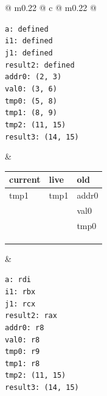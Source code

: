 \begin{figure}[H]
    \centering
    \small
    \begin{tabularx}{\textwidth}{@{} m{} @{\extracolsep{\fill}} c @{\extracolsep{\fill}} m{} @{}}
        \begin{tcolorbox}[standard jigsaw, opacityback=0, colframe=black, arc=4mm, width=\linewidth, height=6.2cm, valign=center, left=2pt, right=2pt]
            \texttt{\small a: defined \\ i1: defined \\ j1: defined \\ result2: defined \\ addr0: (2, 3) \\ val0: (3, 6) \\ tmp0: (5, 8) \\ tmp1: (8, 9) \\ tmp2: (11, 15) \\ result3: (14, 15)}
        \end{tcolorbox} 
        & 
        \renewcommand{\arraystretch}{1.3}
        \begin{tabular}{|p{2cm}|p{2cm}|p{2cm}|}
            \hline
            \textbf{current} & \textbf{live} & \textbf{old} \\ \hline
             tmp1   & tmp1  & addr0 \\ \hline
                    &       & val0  \\ \hline
                    &       & tmp0  \\ \hline
                    &       &       \\ \hline
                    &       &       \\ \hline
            & & \\ \hline
        \end{tabular} 
        & 
        \begin{tcolorbox}[standard jigsaw, opacityback=0, colframe=black, arc=4mm, width=\linewidth, height=6.2cm, valign=center, left=2pt, right=2pt]
            \texttt{\small a: rdi \\ i1: rbx \\ j1: rcx \\ result2: rax \\ addr0: r8 \\ val0: r8 \\ tmp0: r9 \\ tmp1: r8 \\ tmp2: (11, 15) \\ result3: (14, 15)}
        \end{tcolorbox} \\
    \end{tabularx}
\end{figure}


